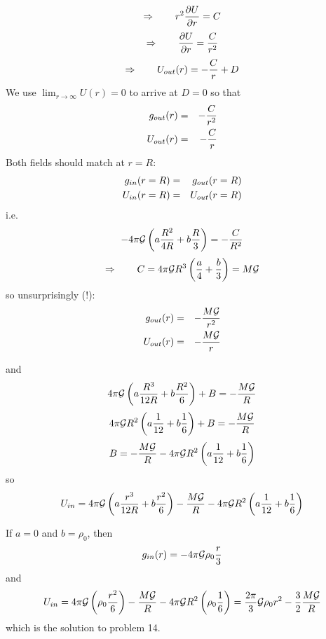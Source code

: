 \begin{equation}
\Rightarrow \qquad
r^2 \frac{\partial U}{\partial r}  = C \nonumber 
\end{equation}
\begin{equation}
\Rightarrow \qquad
\frac{\partial U}{\partial r}  = \frac{C}{r^2} \nonumber
\end{equation}
\begin{equation}
\Rightarrow \qquad
U_{out}(r) = -\frac{C}{r} + D  \nonumber
\end{equation}
We use $\lim_{r\rightarrow\infty}U(r)=0$ to arrive at $D=0$ so that 
\begin{eqnarray}
g_{out}(r) &=& -\frac{C}{r^2}  \nonumber\\
U_{out}(r) &=& -\frac{C}{r} \nonumber
\end{eqnarray}
Both fields should match at $r=R$:
\begin{eqnarray}
g_{in}(r=R) &=& g_{out}(r=R) \nonumber\\
U_{in}(r=R) &=& U_{out}(r=R) \nonumber
\end{eqnarray}
i.e.
\begin{equation}
 -4 \pi {\cal G} \left( a \frac{R^2}{4R} + b \frac{R}{3} \right) 
= -\frac{C}{R^2} 
\end{equation}
\[
\Rightarrow \qquad
C = 4 \pi {\cal G} R^3 \left( \frac{a}{4}+ \frac{b}{3} \right) = M {\cal G}
\]
so unsurprisingly (!):
\begin{eqnarray}
g_{out}(r) &=& -\frac{M{\cal G}}{r^2}  \nonumber\\
U_{out}(r) &=& -\frac{M{\cal G}}{r} \nonumber
\end{eqnarray}


and 
\[
4 \pi {\cal G} \left( a \frac{R^3}{12R} + b \frac{R^2}{6} \right) + B 
= -\frac{M{\cal G}}{R}
\]
\[
4 \pi {\cal G}  R^2 \left( a \frac{1}{12} + b \frac{1}{6} \right) + B 
= -\frac{M {\cal G} }{R}
\]
\[
B = 
-\frac{M {\cal G} }{R}
- 4 \pi {\cal G}  R^2 \left( a \frac{1}{12} + b \frac{1}{6} \right) 
\]
so 
\[
U_{in}= 4 \pi {\cal G} \left( a \frac{r^3}{12R} + b \frac{r^2}{6} \right) 
-\frac{M {\cal G} }{R}
- 4 \pi {\cal G}   R^2 \left( a \frac{1}{12} + b \frac{1}{6} \right) 
\]

If $a=0$ and $b=\rho_0$, then 
\[
g_{in}(r) = -4 \pi {\cal G} \rho_0 \frac{r}{3} 
\]
and 
\[
U_{in}= 4 \pi {\cal G} \left( \rho_0 \frac{r^2}{6} \right) 
-\frac{M {\cal G} }{R}
- 4 \pi {\cal G}   R^2 \left( \rho_0 \frac{1}{6} \right) 
= \frac{2 \pi}{3} {\cal G} \rho_0 r^2 
-\frac32 \frac{M {\cal G} }{R}
\]
which is the solution to problem 14. 




